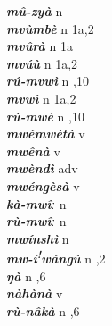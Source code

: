 \begin{multicols}{2}
{{\bfseries\itshape mû-zyà}} \relax  n   \relax  {} \relax   \relax  \\
{{\bfseries\itshape mvùmbè}} \relax  n  \relax  1a,2  \relax   \relax  \\
{{\bfseries\itshape mvûrà}} \relax  n  \relax  1a \relax  {} \relax   \relax  \\
{{\bfseries\itshape mvúù}} \relax  n  \relax  1a,2  \relax   \relax  \\
{{\bfseries\itshape rú-mvwì}} \relax  n  ,10  \relax   \relax  \\
{{\bfseries\itshape mvwì}} \relax  n  \relax  1a,2  \relax   \relax  \\
{{\bfseries\itshape rù-mwè}} \relax  n  ,10  \relax   \relax  \\
{{\bfseries\itshape mwémwètà}} \relax  v  \relax   \relax  {} \relax   \relax  \\
{{\bfseries\itshape mwênà}} \relax  v  \relax   \relax  {} \relax   \relax  \\
{{\bfseries\itshape mwèndì}} \relax  adv  \relax   \relax  {} \relax   \relax  \\
{{\bfseries\itshape mwéngèsà}} \relax  v  \relax   \relax  {} \relax   \relax  \\
{{\bfseries\itshape kà-mwîː}} \relax  n   \relax  {} \relax   \relax  \\
{{\bfseries\itshape rù-mwîː}} \relax  n   \relax  {} \relax   \relax  \\
{{\bfseries\itshape mwínshì}} \relax  n   \relax  {} \relax   \relax  \\
{{\bfseries\itshape mw-í\textsuperscript{!}wángù}} \relax  n  ,2  \relax   \relax  \\
{{\bfseries\itshape ŋà}} \relax  n  ,6  \relax   \relax  \\
{{\bfseries\itshape nàhànà}} \relax  v  \relax   \relax  {} \relax   \relax  \\
{{\bfseries\itshape rù-nâkà}} \relax  n  ,6  \relax   \relax  \\

\end{multicols}
